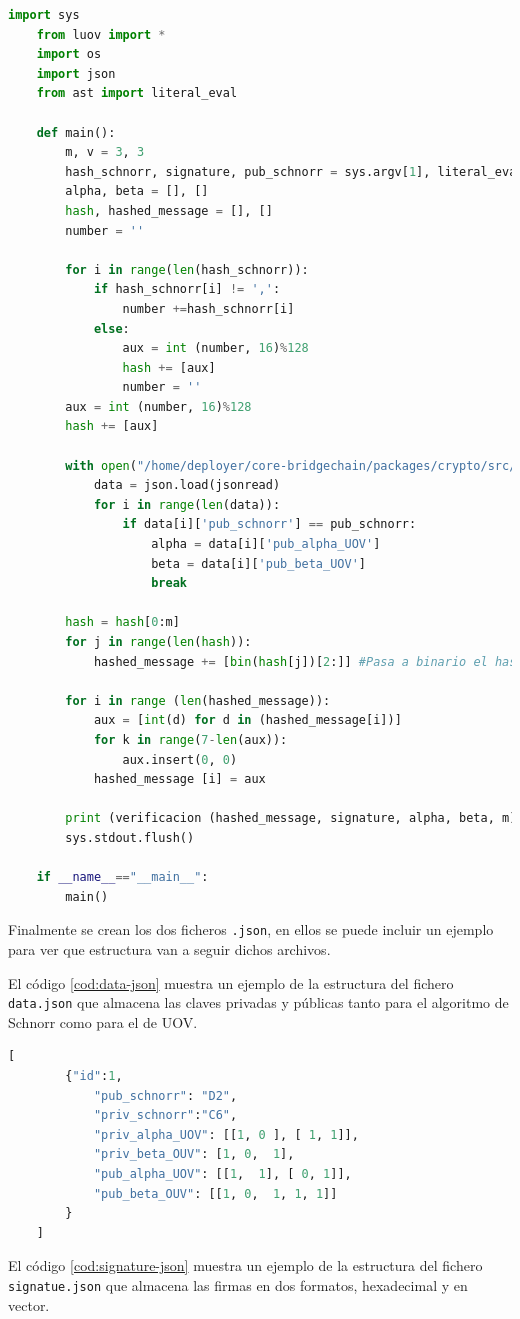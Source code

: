 \begin{lstlisting}[language=Python,caption=Archivo \texttt{verify.py}, label=cod:veri-py]
	import sys
	from luov import *
	import os
	import json
	from ast import literal_eval

	def main():
		m, v = 3, 3
		hash_schnorr, signature, pub_schnorr = sys.argv[1], literal_eval(sys.argv[2]), sys.argv[3]
		alpha, beta = [], []
		hash, hashed_message = [], []
		number = ''

		for i in range(len(hash_schnorr)):
			if hash_schnorr[i] != ',':
				number +=hash_schnorr[i]
			else:
				aux = int (number, 16)%128
				hash += [aux]
				number = ''
		aux = int (number, 16)%128
		hash += [aux]

		with open("/home/deployer/core-bridgechain/packages/crypto/src/crypto/data.json", "r") as jsonread:
			data = json.load(jsonread)
			for i in range(len(data)):
				if data[i]['pub_schnorr'] == pub_schnorr:
					alpha = data[i]['pub_alpha_UOV']
					beta = data[i]['pub_beta_UOV']
					break

		hash = hash[0:m]
		for j in range(len(hash)):
			hashed_message += [bin(hash[j])[2:]] #Pasa a binario el hash

		for i in range (len(hashed_message)):
			aux = [int(d) for d in (hashed_message[i])]
			for k in range(7-len(aux)):
				aux.insert(0, 0)
			hashed_message [i] = aux

		print (verificacion (hashed_message, signature, alpha, beta, m))
		sys.stdout.flush()

	if __name__=="__main__":
		main()
\end{lstlisting}

Finalmente se crean los dos ficheros \texttt{.json}, en ellos se puede incluir un ejemplo para ver que estructura van a seguir dichos archivos. 

El código \ref{cod:data-json} muestra un ejemplo de la estructura del fichero \texttt{data.json} que almacena las claves privadas y públicas tanto para el algoritmo de Schnorr como para el de UOV.

\begin{lstlisting}[language=Python,caption=Ejemplo fichero \texttt{data.json}, label=cod:data-json]
	[
		{"id":1,
			"pub_schnorr": "D2",
			"priv_schnorr":"C6",
			"priv_alpha_UOV": [[1, 0 ], [ 1, 1]],
			"priv_beta_OUV": [1, 0,  1],
			"pub_alpha_UOV": [[1,  1], [ 0, 1]],
			"pub_beta_OUV": [[1, 0,  1, 1, 1]]
		}
	]
\end{lstlisting}

El código \ref{cod:signature-json} muestra un ejemplo de la estructura del fichero \texttt{signatue.json} que almacena las firmas en dos formatos, hexadecimal y en vector.

